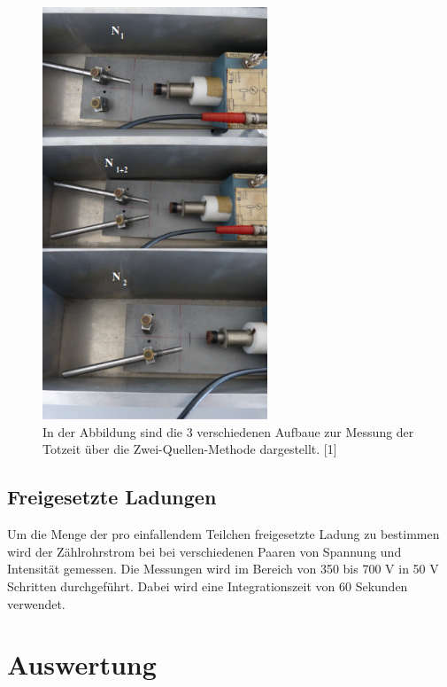 \documentclass[titlepage = firstcover]{scrartcl}
\begin{document}
                \begin{figure}[h]
                  \centering
                  \includegraphics[width = 0.6\textwidth]{Bilder/zweischema.png}
                  \caption{In der Abbildung sind die 3 verschiedenen Aufbaue zur Messung der Totzeit über die Zwei-Quellen-Methode dargestellt. [1]}
                  \label{fig:zweischema}
                \end{figure}
            
               \FloatBarrier
               \noindent
            
        
        \subsection{Freigesetzte Ladungen}
            Um die Menge der pro einfallendem Teilchen freigesetzte Ladung zu bestimmen wird der Zählrohrstrom bei bei verschiedenen Paaren von Spannung und Intensität gemessen. Die Messungen wird 
            im Bereich von 350 bis 700 V in 50 V Schritten durchgeführt. Dabei wird eine Integrationszeit von 60 Sekunden verwendet.
            
    \newpage
    \section{Auswertung}
\end{document}
